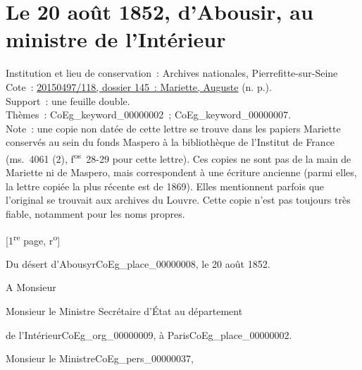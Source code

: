 \documentclass{book}
\begin{document}
\section*{Le 20 août 1852, d’Abousir, au ministre de l'Intérieur}  
{\footnotesize \noindent Institution et lieu de conservation~: Archives nationales, Pierrefitte-sur-Seine\\
Cote~: \hyperlink{CoEg_Mariette_ms_001}{20150497/118, dossier 145~: Mariette, Auguste} (n. p.).\\
Support~: une feuille double.\\
Thèmes~: \gls{CoEg_keyword_00000002}~; \gls{CoEg_keyword_00000007}.\\
Note~: une copie non datée de cette lettre se trouve dans les papiers Mariette conservés au sein du fonds Maspero à la bibliothèque de l’Institut de France (ms.~4061 (2), f\textsuperscript{os}~28-29 pour cette lettre). Ces copies ne sont pas de la main de Mariette ni de Maspero, mais correspondent à une écriture ancienne (parmi elles, la lettre copiée la plus récente est de 1869). Elles mentionnent parfois que l’original se trouvait aux archives du Louvre. Cette copie n’est pas toujours très fiable, notamment pour les noms propres.
\begin{center} [1\textsuperscript{re} page, r\textsuperscript{o}]
\end{center}}
\begin{flushright}
Du désert d’Abousyr\gls{CoEg_place_00000008}, le 20 août 1852.
\end{flushright}
\indent A Monsieur\\
\begin{center}Monsieur le Ministre Secrétaire d’État au département\end{center}
\begin{flushright}de l’Intérieur\gls{CoEg_org_00000009}, à Paris\gls{CoEg_place_00000002}.\end{flushright}

\hspace{1cm} Monsieur le Ministre\gls{CoEg_pers_00000037},\\
\end{document}
